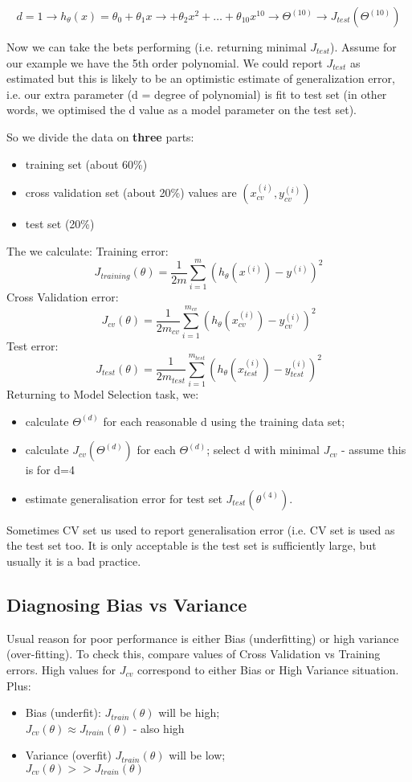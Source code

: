 \documentclass{scrartcl}
\begin{document}
\[ d = 1 \rightarrow h_\theta(x) = \theta_0 + \theta_1x \rightarrow +
\theta_2x^2 + \dots + \theta_{10}x^{10} \rightarrow \Theta^{(10)}  \rightarrow J_{test}(\Theta^{(10)}) \] 

Now we can take the bets performing (i.e. returning minimal
$J_{test}$). Assume for our example we have the 5th order polynomial.
We could report $J_{test}$ as estimated but this is likely to be an
optimistic estimate of generalization error, i.e. our extra parameter
(d = degree of polynomial) is fit to test set (in other words, we
optimised the d value as a model parameter on the test set). 

So we divide the data on {\bf three} parts:
\begin{itemize}
\item training set (about 60\%)
\item cross validation set (about 20\%) values are $(x_{cv}^{(i)},y_{cv}^{(i)})$
\item test set (20\%)
\end{itemize}
The we calculate:
Training error:
\[ J_{training}(\theta) = \frac{1}{2m} \sum
\limits_{i=1}^{m}(h_\theta(x^{(i)}) - y^{(i)})^2 \]
Cross Validation error:
\[ J_{cv}(\theta) = \frac{1}{2m_{cv}} \sum
\limits_{i=1}^{m_{cv}}(h_\theta(x_{cv}^{(i)}) - y_{cv}^{(i)})^2 \]
Test error:
\[ J_{test}(\theta) = \frac{1}{2m_{test}} \sum
\limits_{i=1}^{m_{test}}(h_\theta(x_{test}^{(i)}) - y_{test}^{(i)})^2 \]
Returning to Model Selection task, we:
\begin{itemize}
\item calculate $\Theta^{(d)}$ for each reasonable d using the
  training data set;
\item calculate $J_{cv}(\Theta^{(d)})$ for each $\Theta^{(d)}$; select
 d with minimal $J_{cv}$ - assume this is for d=4
\item estimate generalisation error for test set $J_{test}(\theta^{(4)})$.
\end{itemize}
Sometimes CV set us used to report generalisation error (i.e. CV set
is used as the test set too. It is only acceptable is the test set is
sufficiently large, but usually it is a bad practice.

\subsection{Diagnosing Bias vs Variance}
\label{sec:10-4}

Usual reason for poor performance is either Bias (underfitting) or
high variance (over-fitting). To check this, compare values of Cross
Validation vs Training errors.
High values for $J_{cv}$ correspond to either Bias or High Variance
situation. Plus:
\begin{itemize}
\item Bias (underfit):
$J_{train}(\theta)$ will be high; \\
$J_{cv}(\theta) \approx J_{train}(\theta) $ - also high
\item Variance (overfit)
$J_{train}(\theta)$ will be low; \\
$J_{cv}(\theta) >> J_{train}(\theta) $ 
\end{itemize}
\end{document}
